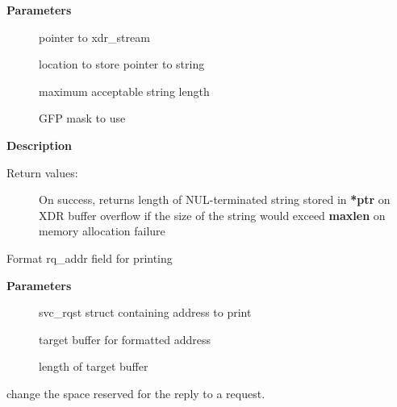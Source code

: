 \documentclass[a4paper,8pt,english]{sphinxmanual}
\begin{document}
\textbf{Parameters}
\begin{description}
\item[{}] \leavevmode
pointer to xdr\_stream

\item[{}] \leavevmode
location to store pointer to string

\item[{}] \leavevmode
maximum acceptable string length

\item[{}] \leavevmode
GFP mask to use

\end{description}

\textbf{Description}
\begin{description}
\item[{Return values:}] \leavevmode
On success, returns length of NUL-terminated string stored in \textbf{*ptr}
 on XDR buffer overflow
 if the size of the string would exceed \textbf{maxlen}
 on memory allocation failure

\end{description}

\begin{fulllineitems}
\label{networking/kapi:c.svc_print_addr}
Format rq\_addr field for printing

\end{fulllineitems}


\textbf{Parameters}
\begin{description}
\item[{}] \leavevmode
svc\_rqst struct containing address to print

\item[{}] \leavevmode
target buffer for formatted address

\item[{}] \leavevmode
length of target buffer

\end{description}

\begin{fulllineitems}
\label{networking/kapi:c.svc_reserve}
change the space reserved for the reply to a request.

\end{fulllineitems}
\end{document}
